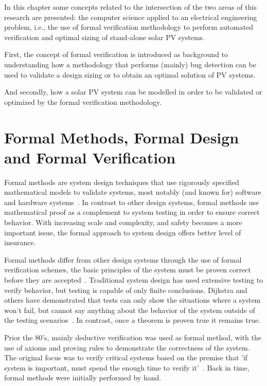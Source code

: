 In this chapter some concepts related to the intersection of the two areas of this research are presented: the computer science applied to an electrical engineering problem, i.e., the use of formal verification methodology to perform automated verification and optimal sizing of stand-alone solar PV systems.

First, the concept of formal verification is introduced as background to understanding how a methodology that performs (mainly) bug detection can be used to validate a design sizing or to obtain an optimal solution of PV systems.

And secondly, how a solar PV system can be modelled in order to be validated or optimized by the formal verification methodology.

\section{Formal Methods, Formal Design and Formal Verification}

Formal methods are system design techniques that use rigorously specified mathematical models to validate systems, most notably (and known for) software and hardware systems~\cite{Collins98}. In contrast to other design systems, formal methods use mathematical proof as a complement to system testing in order to ensure correct behavior. With increasing scale and complexity, and safety becomes a more important issue, the formal approach to system design offers better level of insurance.

Formal methods differ from other design systems through the use of formal verification schemes, the basic principles of the system must be proven correct before they are accepted~\cite{Bowen93}. Traditional system design has used extensive testing to verify behavior, but testing is capable of only finite conclusions. Dijkstra and others have demonstrated that tests can only show the situations where a system won't fail, but cannot say anything about the behavior of the system outside of the testing scenarios~\cite{Bentley99}. In contrast, once a theorem is proven true it remains true.

Prior the 80's, mainly deductive verification was used as formal method, with the use of axioms and proving rules to demonstrate the correctness of the system. The original focus was to verify critical systems based on the premise that 'if system is important, must spend the enough time to verify it'~\cite{Lowry1998}. Back in time, formal methods were initially performed by hand.

